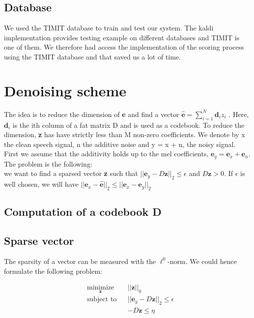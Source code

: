 \documentclass[a4paper]{report}
\newcommand{\ehat}{\hat{\textbf{e}}}
\newcommand{\ey}{\textbf{e}_y}
\newcommand{\ex}{\textbf{e}_x}
\newcommand{\en}{\textbf{e}_n}
\newcommand{\exhat}{ \hat{\textbf{e}} }
\begin{document}
\subsection{Database}
We used the TIMIT database to train and test our system. The kaldi implementation provides testing example on different databases and TIMIT is one of them. We therefore had access the implementation of the scoring process using the TIMIT database and that saved us a lot of time.

\section{Denoising scheme}
The idea is to reduce the dimension of \textbf{e} and find a vector $\ehat = \sum_{i=1}^N\textbf{d}_iz_i$ . Here, $\textbf{d}_i$ is the ith column of a fat matrix D and is used as a codebook. To reduce the dimension, \textbf{z} has have strictly less than M non-zero coefficients.
We denote by x the clean speech signal, n the additive noise and y = x + n, the noisy signal. 
First we assume that the additivity holds up to the mel coefficients, $\ey= \ex + \en$.\\
The problem is the following:\\
we want to find a sparsed vector \textbf{z} such that $||\ey-D\textbf{z}||_2 \leq \epsilon$ and $D\mathbf{z} > 0$. If $\epsilon$ is well chosen, we will have $||\ex - \exhat||_2 \leq ||\ex - \ey||_2$

\subsection{Computation of a codebook D}

\subsection{Sparse vector}
The sparsity of a vector can be measured with the $\ell^0$-norm. We could hence formulate the following problem:

\begin{equation}
  \begin{aligned}
    & \underset{\mathbf{z}}{\text{minimize}}
    & & ||\mathbf{z}||_0 \\
    & \text{subject to}
    & & ||\ey -D\mathbf{z}||_2 \leq \epsilon\\
    &&& -D\mathbf{z} \leq \eta
  \end{aligned}
\label{l0}
\end{equation}
\end{document}
